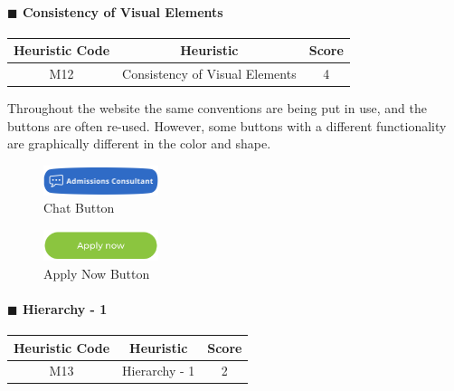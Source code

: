 \documentclass[11pt]{article} %
\begin{document}
\paragraph{$\blacksquare$ Consistency of Visual Elements}
\begin{center}
    \begin{tabular}{|c|c|c|} 
    \hline
    \textbf{Heuristic Code} & \textbf{Heuristic} & \textbf{Score}\\ 
    \hline
    M12 & Consistency of Visual Elements & 4 \\
    \hline
    \end{tabular}
\end{center}
Throughout the website the same conventions are being put in use, and the buttons are often re-used. However, some buttons with a different functionality are graphically different in the color and shape.

\begin{figure}[H]
  \centering
  \includegraphics[width=0.3\textwidth]{Images/Screenshots/Chat Button.png}
  \caption{Chat Button}
\end{figure}

\begin{figure}[H]
  \centering
  \includegraphics[width=0.3\textwidth]{Images/Screenshots/Apply Now Button.png}
  \caption{Apply Now Button}
\end{figure}

\paragraph{$\blacksquare$ Hierarchy - 1}
\begin{center}
    \begin{tabular}{|c|c|c|} 
    \hline
    \textbf{Heuristic Code} & \textbf{Heuristic} & \textbf{Score}\\ 
    \hline
    M13 & Hierarchy - 1 & 2 \\
    \hline
    \end{tabular}
\end{center}
\end{document}
